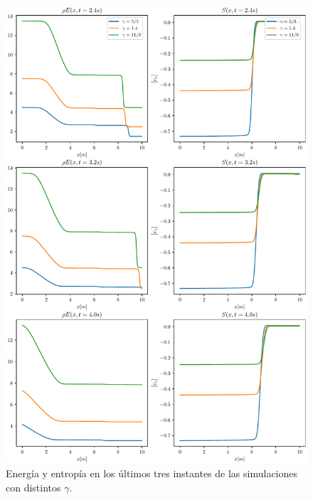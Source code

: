 \begin{figure}[H]
	\includegraphics[width=\linewidth]{../euler1D/experimentos/energia/2.pdf}
	\caption{Energía y entropía en los últimos tres instantes de las simulaciones con distintos $\gamma$.}
	\label{fig:ee-gammas-2}
\end{figure}

